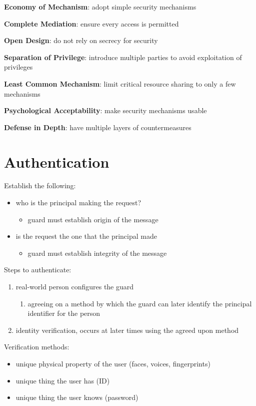 \documentclass[11pt]{article}
\begin{document}
\textbf{Economy of Mechanism}: adopt simple security mechanisms

\textbf{Complete Mediation}: ensure every access is permitted

\textbf{Open Design}: do not rely on secrecy for security

\textbf{Separation of Privilege}: introduce multiple parties to avoid
exploitation of privileges

\textbf{Least Common Mechanism}: limit critical resource sharing to
only a few mechanisms

\textbf{Psychological Acceptability}: make security mechanisms usable

\textbf{Defense in Depth}: have multiple layers of countermeasures
\section{Authentication}
\label{sec:org8f305df}
Establish the following:
\begin{itemize}
\item who is the principal making the request?
\begin{itemize}
\item guard must establish origin of the message
\end{itemize}
\item is the request the one that the principal made
\begin{itemize}
\item guard must establish integrity of the message
\end{itemize}
\end{itemize}

Steps to authenticate:
\begin{enumerate}
\item real-world person configures the guard
\begin{enumerate}
\item agreeing on a method by which the guard can later
identify the principal identifier for the person
\end{enumerate}
\item identity verification, occurs at later times using the
agreed upon method
\end{enumerate}

Verification methods:
\begin{itemize}
\item unique physical property of the user (faces, voices, fingerprints)
\item unique thing the user has (ID)
\item unique thing the user knows (password)
\end{itemize}
\end{document}

